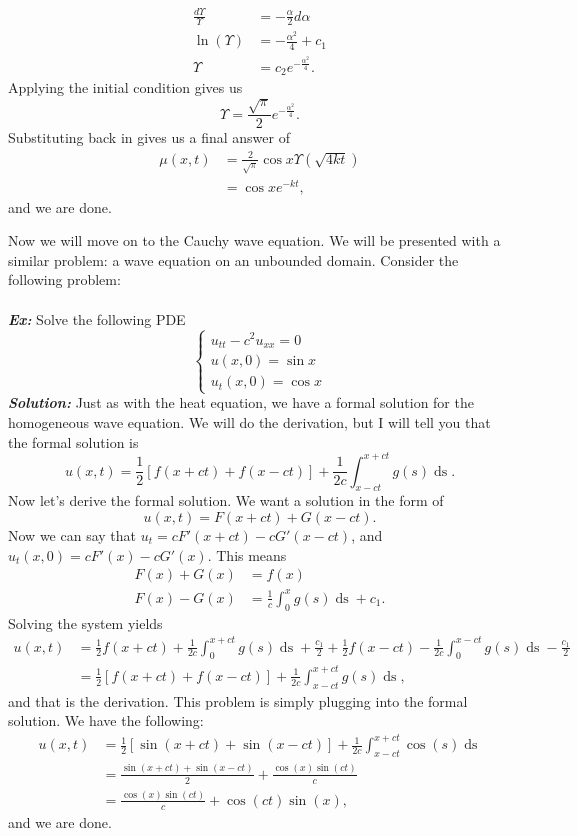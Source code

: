 \documentclass{article}
\begin{document}
\begin{align*}
\frac{d\Upsilon}{\Upsilon} &= -\frac{\alpha}{2}d\alpha\\
\ln{(\Upsilon)} &= -\frac{\alpha^{2}}{4} + c_{1}\\
\Upsilon &= c_{2}e^{-\frac{\alpha^{2}}{4}}.
\end{align*}
Applying the initial condition gives us
\[
\Upsilon = \frac{\sqrt{\pi}}{2}e^{-\frac{\alpha^{2}}{4}}.
\]
Substituting back in gives us a final answer of
\begin{align*}
\mu(x,t) &= \frac{2}{\sqrt{\pi}}\cos{x}\Upsilon(\sqrt{4kt})\\
&= \cos{x}e^{-kt},
\end{align*}
and we are done.


\newpage
\indent Now we will move on to the Cauchy wave equation. We will be presented with a similar problem: a wave equation on an unbounded domain. Consider the following problem:
\noindent \\\\
\noindent \textbf{\textit{Ex:}} Solve the following PDE
\[
\begin{cases}
u_{tt} - c^{2}u_{xx} = 0\\
u(x,0) = \sin{x}\\
u_{t}(x,0) = \cos{x}
\end{cases}
\]
\indent \textbf{\textit{Solution:}} Just as with the heat equation, we have a formal solution for the homogeneous wave equation. We will do the derivation, but I will tell you that the formal solution is
\[
u(x,t) = \frac{1}{2}\left[f(x+ct) + f(x-ct)\right] + \frac{1}{2c}\int_{x-ct}^{x+ct}g(s)\mathop{ds}.
\]
Now let's derive the formal solution. We want a solution in the form of
\[
u(x,t) = F(x+ct) + G(x-ct).
\]
Now we can say that $u_{t} = cF'(x+ct) - cG'(x-ct)$, and $u_{t}(x,0) = cF'(x) - cG'(x)$. This means
\begin{align*}
F(x) + G(x) &= f(x)\\
F(x) - G(x) &= \frac{1}{c}\int_{0}^{x}g(s)\mathop{ds} + c_{1}.
\end{align*}
Solving the system yields
\begin{align*}
u(x,t) &= \frac{1}{2} f(x+ct) + \frac{1}{2c}\int_{0}^{x+ct}g(s)\mathop{ds} + \frac{c_{1}}{2} + \frac{1}{2}f(x-ct) -\frac{1}{2c}\int_{0}^{x-ct}g(s)\mathop{ds} - \frac{c_{1}}{2}\\
&= \frac{1}{2}\left[f(x+ct) + f(x-ct)\right] + \frac{1}{2c}\int_{x-ct}^{x+ct}g(s)\mathop{ds},
\end{align*}
and that is the derivation. This problem is simply plugging into the formal solution. We have the following:
\begin{align*}
u(x,t) &= \frac{1}{2}\left[\sin{(x+ct)} + \sin{(x-ct)}\right] + \frac{1}{2c}\int_{x-ct}^{x+ct}\cos{(s)}\mathop{ds}\\
&= \frac{\sin{(x+ct)} + \sin{(x-ct)}}{2} + \frac{\cos{(x)}\sin{(ct)}}{c}\\
&=  \frac{\cos{(x)}\sin{(ct)}}{c} + \cos{(ct)}\sin{(x)},
\end{align*}
and we are done.
\end{document}
